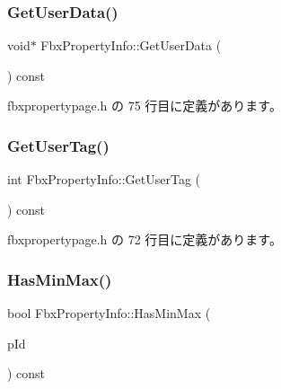 \subsubsection{\texorpdfstring{Get\+User\+Data()}{GetUserData()}}
{\footnotesize\ttfamily void$\ast$ Fbx\+Property\+Info\+::\+Get\+User\+Data (\begin{DoxyParamCaption}{ }\end{DoxyParamCaption}) const\hspace{0.3cm}{\ttfamily [inline]}}



 fbxpropertypage.\+h の 75 行目に定義があります。

\mbox{\label{class_fbx_property_info_af756a4aefd06a0f57781a7c99cd8d133}} 
\subsubsection{\texorpdfstring{Get\+User\+Tag()}{GetUserTag()}}
{\footnotesize\ttfamily int Fbx\+Property\+Info\+::\+Get\+User\+Tag (\begin{DoxyParamCaption}{ }\end{DoxyParamCaption}) const\hspace{0.3cm}{\ttfamily [inline]}}



 fbxpropertypage.\+h の 72 行目に定義があります。

\mbox{\label{class_fbx_property_info_a1a65cdd1e8e312570977b7a394bb760f}} 
\subsubsection{\texorpdfstring{Has\+Min\+Max()}{HasMinMax()}}
{\footnotesize\ttfamily bool Fbx\+Property\+Info\+::\+Has\+Min\+Max (\begin{DoxyParamCaption}\item[{\hyperlink{class_fbx_property_info_a83069f079a29bde133f2e9324de5af43}{E\+Value\+Index}}]{p\+Id }\end{DoxyParamCaption}) const\hspace{0.3cm}{\ttfamily [inline]}}



